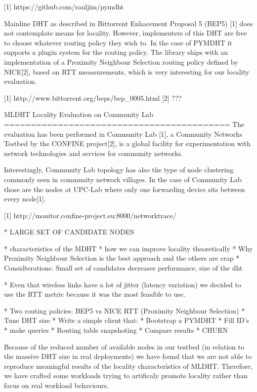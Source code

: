     [1] https://github.com/rauljim/pymdht

Mainline DHT as described in Bittorrent Enhacement Proposal 5 (BEP5) [1] does not 
contemplate means for locality. However, implementers of this DHT are free to choose 
whatever routing policy they wish to. In the case of PYMDHT it supports a plugin system 
for the routing policy. The library ships with an implementation of a Proximity Neighbour 
Selection routing policy defined by NICE[2], based on RTT meassurements, which 
is very interesting for our locality evaluation.

    [1] http://www.bittorrent.org/beps/bep_0005.html
    [2] ???



MLDHT Locality Evaluation on Community Lab
==========================================
The evaluation has been performed in Community Lab [1], a Community Networks Testbed 
by the CONFINE project[2], is a global facility for experimentation with network 
technologies and services for community networks.

Interestingly, Community Lab topology has also the type of node clustering commonly 
seen in community network villages. In the case of Community Lab those are the nodes 
at UPC-Lab where only one forwarding device sits between every node[1].

[1] http://monitor.confine-project.eu:8000/networktrace/




* LARGE SET OF CANDIDATE NODES


* characteristics of the MDHT
* how we can improve locality theoretically
* Why Proximity Neighbour Selection is the best approach and the others are crap
* Considterations: Small set of candidates decreases performance, size of the dht

* Even that wireless links have a lot of jitter (latency variation) we decided to 
use the RTT metric because it was the most feasible to use.

* Two routing policies: BEP5 vs NICE RTT (Proximity Neighbour Selection)
* Tune DHT size
* Write a simple client that:
    * Bootstrap a PYMDHT
    * Fill ID's 
    * make queries
* Routing table snapshoting
* Compare results
* CHURN


Because of the reduced number of available nodes in our testbed (in relation to 
the massive DHT size in real deployments) we have found that we are not able to 
reproduce meaningful results of the locality characteristics of MLDHT. 
Therefore, we have crafted some workloads trying to artificaly promote locality 
rather than focus on real workload behaviours.

